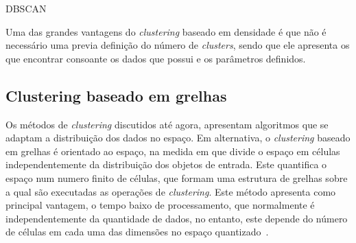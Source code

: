 \begin{algorithm}[ht]
\caption{DBSCAN}\label{dbscan}
\begin{algorithmic}[1]
	\Repeat
					\EndIf
				\EndIf
				\EndIf
			\EndFor
		\EndIf
\EndProcedure 
\end{algorithmic}
\end{algorithm}

Uma das grandes vantagens do \textit{clustering} baseado em densidade é que não é necessário uma previa definição do número de \textit{clusters}, sendo que ele apresenta os que encontrar consoante os dados que possui e os parâmetros definidos. 


\subsection{Clustering baseado em grelhas} %

Os métodos de \textit{clustering} discutidos até agora, apresentam algoritmos que se adaptam a distribuição dos dados no espaço. Em alternativa, o \textit{clustering} baseado em grelhas é orientado ao espaço, na medida em que divide o espaço em células independentemente da distribuição dos objetos de entrada. Este quantifica o espaço num numero finito de células, que formam uma estrutura de grelhas sobre a qual são executadas as operações de \textit{clustering}. Este método apresenta como principal vantagem, o tempo baixo de processamento, que normalmente é independentemente da quantidade de dados, no entanto, este depende do número de células em cada uma das dimensões no espaço quantizado~\cite{Han2006}.

